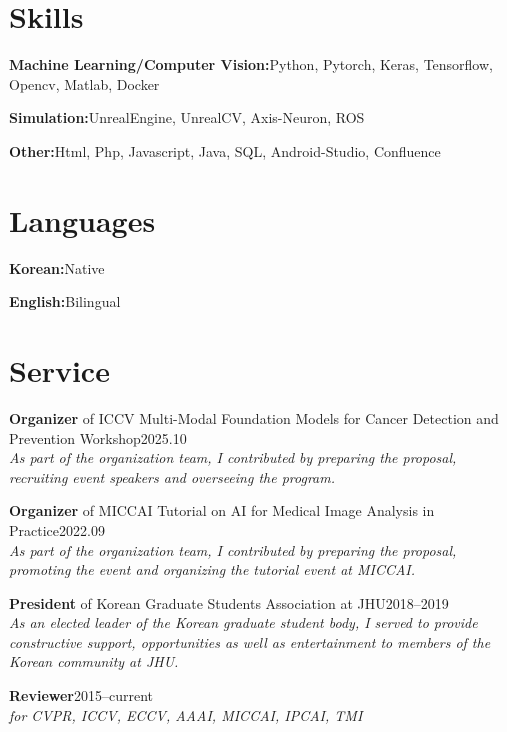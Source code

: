 \documentclass[11pt,letterpaper]{article}
\newcommand{\dated}[3]{\item #1\hfill #2\hspace*{3.3pt}\null\\[1.5pt]#3}
\newcommand{\lbl}[1]{\textbf{#1}\hspace{9.4pt}}
\begin{document}
\begin{minipage}[t]{0.49\textwidth}
  \section*{Skills}
  \begin{cvbullets}[itemsep=3.4pt]
    \raggedright
    \item \lbl{Machine Learning/Computer Vision:}Python,
          Pytorch, Keras, Tensorflow, Opencv, Matlab, Docker
    \item \lbl{Simulation:}UnrealEngine, UnrealCV, Axis-Neuron,
          ROS
    \item \lbl{Other:}Html, Php, Javascript, Java, SQL,
          Android-Studio, Confluence
  \end{cvbullets}
\end{minipage}%
\hfill
\begin{minipage}[t]{0.49\textwidth}
  \section*{Languages}
  \begin{cvbullets}
    \item \lbl{Korean:}Native
    \item \lbl{English:}Bilingual
  \end{cvbullets}
\end{minipage}

\vspace{3.5pt}
\section*{Service}
\begin{cvbullets}
  \dated{\textbf{Organizer} of ICCV Multi-Modal Foundation Models for Cancer Detection and Prevention Workshop}{2025.10}
        {\textit{As part of the organization team, I contributed by preparing the proposal, recruiting event speakers and overseeing the
         program.}}
  \dated{\textbf{Organizer} of MICCAI Tutorial on AI for Medical Image Analysis in Practice}{2022.09}
        {\textit{As part of the organization team, I contributed by preparing the proposal, promoting the event and organizing the
         tutorial event at MICCAI.}}
  \dated{\textbf{President} of Korean Graduate Students Association at JHU}{2018--2019}
        {\textit{As an elected leader of the Korean graduate student body, I served to provide constructive support, opportunities as
         well as entertainment to members of the Korean community at JHU.}}
  \dated{\textbf{Reviewer}}{2015--current}
        {\textit{for CVPR, ICCV, ECCV, AAAI, MICCAI, IPCAI, TMI}}
\end{cvbullets}
\end{document}
